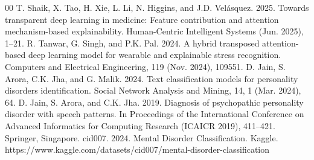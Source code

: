 \documentclass[conference]{IEEEtran}
\begin{document}
\begin{thebibliography}{00}
 T. Shaik, X. Tao, H. Xie, L. Li, N. Higgins, and J.D. Velásquez. 2025. Towards transparent deep learning in medicine: Feature contribution and attention mechanism-based explainability. Human-Centric Intelligent Systems (Jun. 2025), 1--21.
 R. Tanwar, G. Singh, and P.K. Pal. 2024. A hybrid transposed attention-based deep learning model for wearable and explainable stress recognition. Computers and Electrical Engineering, 119 (Nov. 2024), 109551.
 D. Jain, S. Arora, C.K. Jha, and G. Malik. 2024. Text classification models for personality disorders identification. Social Network Analysis and Mining, 14, 1 (Mar. 2024), 64.
 D. Jain, S. Arora, and C.K. Jha. 2019. Diagnosis of psychopathic personality disorder with speech patterns. In Proceedings of the International Conference on Advanced Informatics for Computing Research (ICAICR 2019), 411--421. Springer, Singapore.
 cid007. 2024. Mental Disorder Classification. Kaggle. https://www.kaggle.com/datasets/cid007/mental-disorder-classification
\end{thebibliography}
\end{document}
